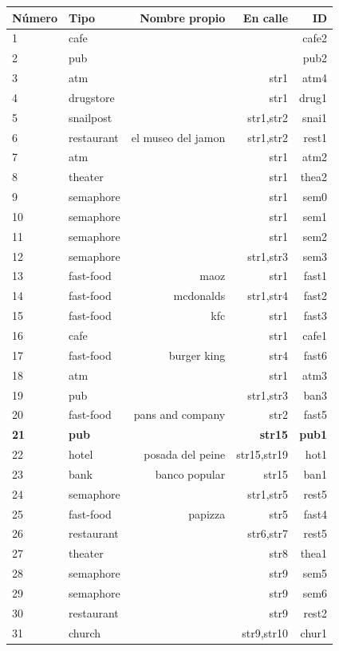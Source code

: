 \begin{table}[H]
{\footnotesize
\begin{center}
\begin{tabular}{|l|l|r|r|r|}
\hline
N\'umero&Tipo & Nombre propio & En calle & ID\\
\hline

1&cafe & & & cafe2 \\
2&pub	& & & pub2 \\
3&atm	& & str1 & atm4 \\
4&drugstore & & str1 & drug1\\
5&snailpost & & str1,str2 & snai1\\
6&restaurant & el museo del jamon & str1,str2 & rest1\\
7&atm	& & str1 & atm2\\
8&theater & & str1 & thea2\\
9&semaphore & & str1 & sem0\\
10&semaphore & & str1 & sem1\\
11&semaphore & & str1 & sem2\\
12&semaphore & & str1,str3 & sem3\\
13&fast-food & maoz & str1 & fast1\\
14&fast-food & mcdonalds & str1,str4 & fast2\\
15&fast-food & kfc & str1 & fast3\\
16&cafe & & str1 & cafe1\\
17&fast-food & burger king & str4 & fast6\\
18&atm	& & str1 & atm3\\
19&pub	& & str1,str3 & ban3\\
20&fast-food & pans and company & str2 & fast5\\
\textbf{21}&\textbf{pub}	& & \textbf{str15} & \textbf{pub1}\\
22&hotel & posada del peine & str15,str19 & hot1\\
23&bank & banco popular & str15 & ban1\\
24&semaphore & & str1,str5 & rest5\\
25&fast-food & papizza & str5 & fast4\\
26&restaurant	& & str6,str7 & rest5\\
27&theater	& & str8 & thea1\\
28&semaphore & & str9 & sem5\\
29&semaphore & & str9 & sem6\\
30&restaurant & & str9 & rest2\\
31&church	& & str9,str10 & chur1\\

\end{tabular}
\end{center}}
\end{table}
